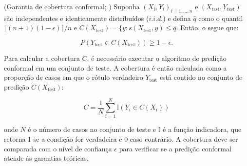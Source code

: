 \begin{theorem}
\label{theorem:conformal-prediction}
    (Garantia de cobertura conformal; \cite{Vovk1999}) Suponha $(X_i,Y_i)_{i=1,...,n}$ e $(X_\text{test},Y_\text{test})$ são independentes e identicamente distribuídos ($i.i.d.$) e defina $\hat{q}$ como o quantil ${\lceil (n+1)(1-\epsilon) \rceil}/n$ e $C(X_\text{test}) = \lbrace y : s(X_\text{test},y) \leq \hat{q}$. Então, o segue que:

    \begin{equation}
        P(Y_\text{test} \in C(X_\text{test})) \geq 1 - \epsilon.
    \end{equation}
\end{theorem}

Para calcular a cobertura $C$, é necessário executar o algoritmo de predição conformal em um conjunto de teste. A cobertura é então calculada como a proporção de casos em que o rótulo verdadeiro $Y_\text{test}$ está contido no conjunto de predição $C(X_\text{test})$:

\begin{equation}
    C = \frac{1}{N} \sum_{i=1}^{N} \mathbb{I}(Y_i \in C(X_i))
\end{equation}

onde $N$ é o número de casos no conjunto de teste e $\mathbb{I}$ é a função indicadora, que retorna 1 se a condição for verdadeira e 0 caso contrário. A cobertura deve ser comparada com o nível de confiança $\epsilon$ para verificar se a predição conformal atende às garantias teóricas.